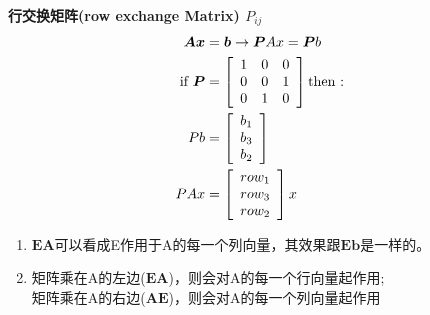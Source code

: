 \documentclass{book}
\begin{document}
\textbf{行交换矩阵(row exchange Matrix) $P_{ij}$}
\begin{equation*}
  \begin{aligned}
    \boldsymbol{Ax}&=\boldsymbol{b} \rightarrow \boldsymbol{P}Ax=\boldsymbol{P}b\\
    \text{if } \boldsymbol{P}&=
    \left[
      \begin{array}{c c c}
        1 & 0 & 0 \\ 
        0 & 0 & 1 \\ 
        0 & 1 & 0
      \end{array}
    \right]\text{then :}\\
  Pb&=\left[\begin{array}{c}
    b_1\\ b_3 \\ b_2 
  \end{array}\right]\\ 
    PAx&=\left[
      \begin{array}{c}
      row_1\\ row_3\\row_2
      \end{array}\right]x
  \end{aligned}
  \label{eq: matrix4}
\end{equation*}

\begin{enumerate}
  \item $\boldsymbol{EA}$可以看成E作用于A的每一个列向量，其效果跟$\boldsymbol{Eb}$是一样的。
  \item 矩阵乘在A的左边($\boldsymbol{EA}$)，则会对A的每一个行向量起作用;\\
    矩阵乘在A的右边($\boldsymbol{AE}$)，则会对A的每一个列向量起作用
\end{enumerate}
\end{document}
